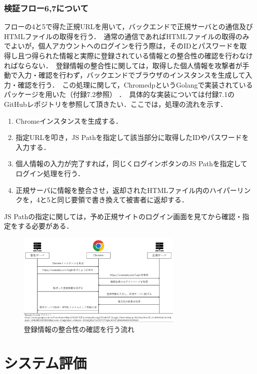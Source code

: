 \documentclass[dvipdfmx,twocolumn,9pt]{jsarticle}
\begin{document}
            \subsubsection{検証フロー6,7について}
                フローの4と5で得た正規URLを用いて，バックエンドで正規サーバとの通信及びHTMLファイルの取得を行う．\
                通常の通信であればHTMLファイルの取得のみでよいが，個人アカウントへのログインを行う際は，そのIDとパスワードを取得し且つ得られた情報と実際に登録されている情報との整合性の確認を行わなければならない．\
                登録情報の整合性に関しては，取得した個人情報を攻撃者が手動で入力・確認を行わず，バックエンドでブラウザのインスタンスを生成して入力・確認を行う．\
                この処理に関して，ChromedpというGolangで実装されているパッケージを用いた（付録7.2参照） ．\
                具体的な実装については付録7.1のGitHubレポジトリを参照して頂きたい．ここでは，処理の流れを示す．\
                \begin{enumerate}
                    \item Chromeインスタンスを生成する．
                    \item 指定URLを叩き，JS Pathを指定して該当部分に取得したIDやパスワードを入力する．
                    \item 個人情報の入力が完了すれば，同じくログインボタンのJS Pathを指定してログイン処理を行う．
                    \item 正規サーバに情報を整合させ，返却されたHTMLファイル内のハイパーリンクを，4と5と同じ要領で書き換えて被害者に返却する．
                \end{enumerate}
                JS Pathの指定に関しては，予め正規サイトのログイン画面を見てから確認・指定をする必要がある．\
                \begin{figure}[t]
                    \centering
                    \includegraphics[width=8cm]{img/vc-vf-6-7.png}
                    \caption{登録情報の整合性の確認を行う流れ}
                    \label{flow-6-7}
                \end{figure}
    \section{システム評価}
\end{document}
